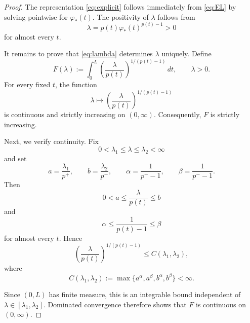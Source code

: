 \documentclass[12pt]{amsart}
\numberwithin{equation}{section}
\theoremstyle{plain}
\theoremstyle{definition}
\begin{document}
\begin{proof}
The representation \eqref{eq:explicit} follows immediately from
\eqref{eq:EL} by solving pointwise for $\varphi_*(t)$. The positivity
of $\lambda$ follows from
\begin{equation*}
\lambda
=
p(t)\varphi_*(t)^{p(t)-1}>0
\end{equation*}
for almost every $t$.

It remains to prove that \eqref{eq:lambda} determines $\lambda$
uniquely. Define
\begin{equation*}
F(\lambda)
:=
\int_0^L
\left(
\frac{\lambda}{p(t)}
\right)^{1/(p(t)-1)}
\,dt,
\qquad
\lambda>0.
\end{equation*}
For every fixed $t$, the function
\begin{equation*}
\lambda
\longmapsto
\left(
\frac{\lambda}{p(t)}
\right)^{1/(p(t)-1)}
\end{equation*}
is continuous and strictly increasing on $(0,\infty)$. Consequently,
$F$ is strictly increasing.

Next, we verify continuity. Fix
\begin{equation*}
0<\lambda_1\le\lambda\le\lambda_2<\infty
\end{equation*}
and set
\begin{equation*}
a=\frac{\lambda_1}{p^+},
\qquad
b=\frac{\lambda_2}{p^-},
\qquad
\alpha=\frac{1}{p^+-1},
\qquad
\beta=\frac{1}{p^--1}.
\end{equation*}
Then
\begin{equation*}
0<a\le\frac{\lambda}{p(t)}\le b
\end{equation*}
and
\begin{equation*}
\alpha
\le
\frac{1}{p(t)-1}
\le
\beta
\end{equation*}
for almost every $t$. Hence
\begin{equation*}
\left(
\frac{\lambda}{p(t)}
\right)^{1/(p(t)-1)}
\le
C(\lambda_1,\lambda_2),
\end{equation*}
where
\begin{equation*}
C(\lambda_1,\lambda_2)
:=
\max\{a^\alpha,a^\beta,b^\alpha,b^\beta\}<\infty.
\end{equation*}


Since $(0,L)$ has finite measure, this is an integrable bound
independent of $\lambda\in[\lambda_1,\lambda_2]$. Dominated convergence
therefore shows that $F$ is continuous on $(0,\infty)$.


\end{proof}
\end{document}
